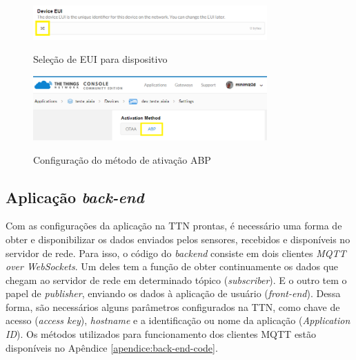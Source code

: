 \documentclass[oneside,openright,12pt]{ufsm_2015} %
\begin{document}
    \begin{figure}[ht]
 	    \caption{\label{exepretex} Seleção de EUI para dispositivo}
        \centering
        \includegraphics[width=0.8\textwidth]{figuras/device_eui.png}
        \vspace{\baselineskip} %
        \label{fig:dev-eui-ttn}
    \end{figure}
    
    \begin{figure}[ht]
 	    \caption{\label{exepretex} Configuração do método de ativação ABP}
        \centering
        \includegraphics[width=0.8\textwidth]{figuras/device_settings.png}
        \vspace{\baselineskip} %
        \label{fig:dev-settings-ttn}
    \end{figure}
    
    \subsection{Aplicação \textit{back-end}}
    Com as configurações da aplicação na TTN prontas, é necessário uma forma de obter e disponibilizar os dados enviados pelos sensores, recebidos e disponíveis no servidor de rede. Para isso, o código do \textit{backend} consiste em dois clientes \textit{MQTT over WebSockets}. Um deles tem a função de obter continuamente os dados que chegam ao servidor de rede em determinado tópico (\textit{subscriber}). E o outro tem o papel de \textit{publisher}, enviando os dados à aplicação de usuário (\textit{front-end}). Dessa forma, são necessários alguns parâmetros configurados na TTN, como chave de acesso (\textit{access key}), \textit{hostname} e a identificação ou nome da aplicação (\textit{Application ID}). Os métodos utilizados para funcionamento dos clientes MQTT estão disponíveis no Apêndice \ref{apendice:back-end-code}.
    
\end{document}
